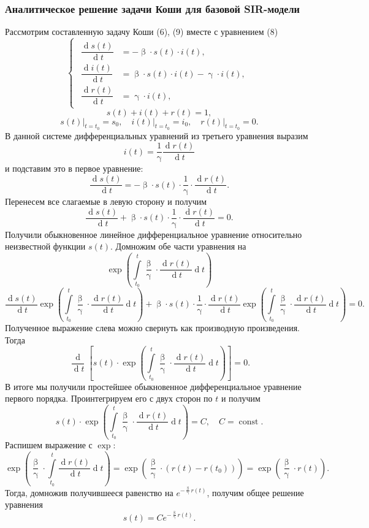 \documentclass[a4paper, 12pt]{extarticle}
\numberwithin{equation}{section}
\renewcommand{\beta}{\upbeta}
\renewcommand{\gamma}{\upgamma}
\renewcommand{\d}{\operatorname{d}}
\begin{document}
	\subsubsection{Аналитическое решение задачи Коши для базовой SIR-модели}
	Рассмотрим составленную задачу Коши (6), (9) вместе с уравнением (8)
	$$
	\left\{ 
	\begin{gathered} 
		\begin{aligned}
			\dfrac {\d s(t)}{\d t} &= -\beta \cdot s(t) \cdot i(t),\\
			\dfrac{\d i(t)}{\d t} &= \beta \cdot s(t)\cdot i(t) - \gamma\cdot i(t),\\
			\dfrac{\d r(t)}{\d t} &= \gamma\cdot i(t),
		\end{aligned}
	\end{gathered} 
	\right.
	$$
	$$
	s(t) + i(t) + r(t) = 1,
	$$
	$$
	s(t)\Big|_{t=t_0} = s_0,\quad i(t)\Big|_{t=t_0} = i_0,\quad r(t)\Big|_{t=t_0} = 0.
	$$
	В данной системе дифференциальных уравнений из третьего уравнения выразим $$i(t) = \dfrac1\gamma\dfrac{\d r(t)}{\d t}$$ и подставим это в первое уравнение:
	$$\dfrac {\d s(t)}{\d t} = -\beta \cdot s(t) \cdot \dfrac1\gamma\cdot\dfrac{\d r(t)}{\d t}.$$
	Перенесем все слагаемые в левую сторону и получим 
	$$\dfrac {\d s(t)}{\d t} +\beta \cdot s(t) \cdot \dfrac1\gamma\cdot\dfrac{\d r(t)}{\d t} = 0.$$
	Получили обыкновенное линейное дифференциальное уравнение относительно неизвестной функции $s(t)$. Домножим обе части уравнения на $$\exp \left(\int\limits_{t_0}^t \dfrac \beta \gamma\cdot \dfrac{\d r(t)}{\d t} \d t \right)$$
	$$\dfrac {\d s(t)}{\d t} \exp \left(\int\limits_{t_0}^t \dfrac \beta \gamma\cdot \dfrac{\d r(t)}{\d t} \d t \right) +\beta \cdot s(t) \cdot \dfrac1\gamma\cdot\dfrac{\d r(t)}{\d t} \exp \left(\int\limits_{t_0}^t \dfrac \beta \gamma\cdot \dfrac{\d r(t)}{\d t} \d t \right) = 0.$$
	Полученное выражение слева можно свернуть как производную произведения. Тогда 
	$$\dfrac{\d}{\d t}\left[s(t)\cdot \exp \left(\int\limits_{t_0}^t \dfrac \beta \gamma\cdot \dfrac{\d r(t)}{\d t} \d t \right)\right] = 0.$$
	В итоге мы получили простейшее обыкновенное дифференциальное уравнение первого порядка. Проинтегрируем его с двух сторон по $t$ и получим
	$$s(t)\cdot \exp \left(\int\limits_{t_0}^t \dfrac \beta \gamma\cdot \dfrac{\d r(t)}{\d t} \d t \right) = C,\quad C = \operatorname{const}.$$
	Распишем выражение с $\exp$: $$\exp \left(\dfrac \beta \gamma\cdot\int\limits_{t_0}^t  \dfrac{\d r(t)}{\d t} \d t \right) = \exp \left(\dfrac \beta \gamma\cdot( r(t) - r(t_0))\right) = \exp \left(\dfrac \beta \gamma\cdot r(t)\right).$$
	Тогда, домножив получившееся равенство на $e^{-\frac\beta \gamma r(t)}$, получим общее решение уравнения $$s(t) = C e^{-\frac\beta \gamma r(t)}.$$
\end{document}
